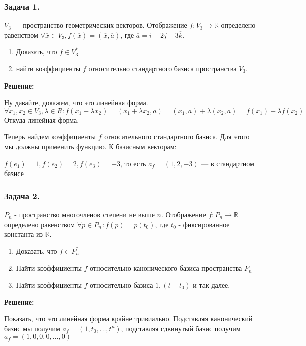\subsubsection{Задача 1.}

$V_3$ --- пространство геометрических векторов. Отображение $f:V_3 \xrightarrow{} \mathbb{R}$ определено равенством $\forall \overline{x} \in V_3, f(\overline{x})=(\overline{x},\overline{a})$, где $\overline{a} = \overline{i} + 2 \overline{j} - 3 \overline{k}$.

\begin{enumerate}
    \item Доказать, что $f \in V_3^*$
    \item найти коэффициенты $f$ относительно стандартного базиса пространства $V_3$.
\end{enumerate}

\textbf{Решение:}

Ну давайте, докажем, что это линейная форма.
$$\forall x_1,x_2 \in V_3, \lambda \in R:f(x_1 + \lambda x_2) = (x_1+\lambda x_2, a) = (x_1,a) + \lambda(x_2,a) = f(x_1)+\lambda f(x_2)$$
Откуда линейная форма.

Теперь найдем коэффициенты $f$ относительного стандартного базиса. Для этого мы должны применить функцию. К базисным векторам:

$f(e_1) = 1, f(e_2 ) =2, f(e_3) = -3$, то есть $a_f=(1,2,-3)$ --- в стандартном базисе

\subsubsection{Задача 2.}

$P_n$ - пространство многочленов степени не выше $n$. Отображение $f:P_n\xrightarrow{} \mathbb{R}$ определено равенством $\forall p \in P_n: f(p) = p(t_0)$, где $t_0$ - фиксированное константа из $\mathbb{R}$.

\begin{enumerate}
    \item Доказать, что $f\in P_n^*$
    \item Найти коэффициенты $f$ относительно канонического базиса пространства $P_n$
    \item Найти коэффициенты $f$ относительно базиса $1,(t-t_0)$ и так далее.
\end{enumerate}

\textbf{Решение:}

Показать, что это линейная форма крайне тривиально. Подставляя канонический базис мы получим $a_f =(1,t_0,\ldots,t^n)$, подставляя сдвинутый базис получим $a_f = (1,0,0,0,\ldots ,0)$

